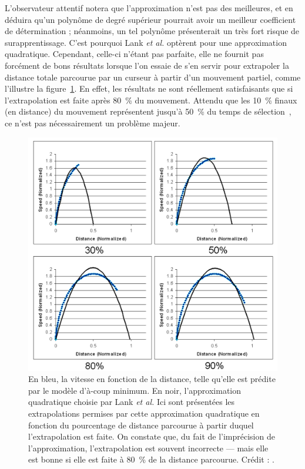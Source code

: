 \begin{appendices}
	L'observateur attentif notera que l'approximation n'est pas des meilleures, et en déduira qu'un polynôme de degré supérieur pourrait avoir un meilleur coefficient de détermination ; néanmoins, un tel polynôme présenterait un très fort risque de surapprentissage. C'est pourquoi Lank \emph{et al.} optèrent pour une approximation quadratique. Cependant, celle-ci n'étant pas parfaite, elle ne fournit pas forcément de bons résultats lorsque l'on essaie de s'en servir pour extrapoler la distance totale parcourue par un curseur à partir d'un mouvement partiel, comme l'illustre la figure~\ref{fig:kepExtrapol}. En effet, les résultats ne sont réellement satisfaisants que si l'extrapolation est faite après 80~\%{} du mouvement. Attendu que les 10~\%{} finaux (en distance) du mouvement représentent jusqu'à 50~\%{} du temps de sélection~\cite{mackenzie1987three, graham1996physical}, ce n'est pas nécessairement un problème majeur.

	
	\begin{figure}[htbp]
		\centering
		\includegraphics[width=\textwidth]{figures/ch2/kepExtrapol}
		\caption[KEP -- approximation quadratique et extrapolation]{En bleu, la vitesse en fonction de la distance, telle qu'elle est prédite par le modèle d'à-coup minimum. En noir, l'approximation quadratique choisie par Lank \emph{et al.} Ici sont présentées les extrapolations permises par cette approximation quadratique en fonction du pourcentage de distance parcourue à partir duquel l'extrapolation est faite. On constate que, du fait de l'imprécision de l'approximation, l'extrapolation est souvent incorrecte --- mais elle est bonne si elle est faite à 80~\%{} de la distance parcourue. Crédit : \cite{lank2007endpoint}.}
		\label{fig:kepExtrapol}
	\end{figure}
	

\end{appendices}
